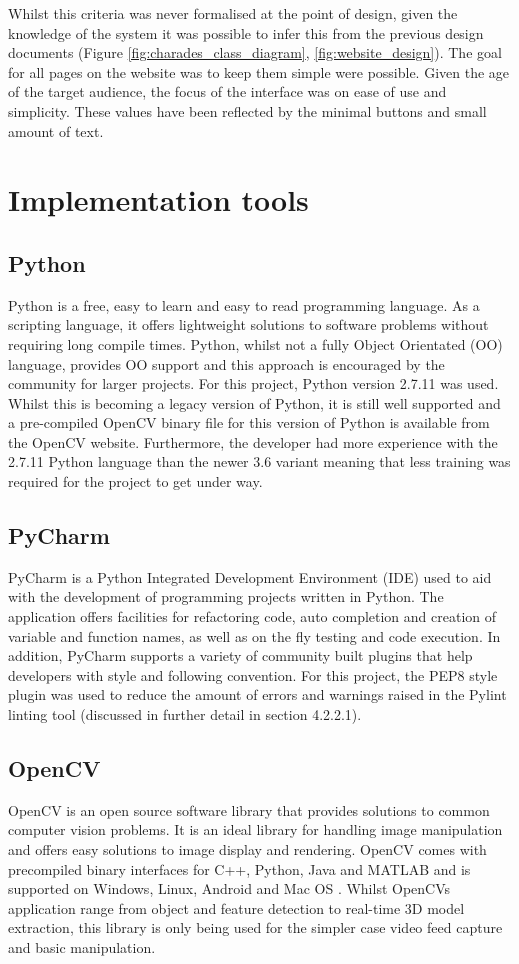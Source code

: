 Whilst this criteria was never formalised at the point of design, given the knowledge of the system it was possible to infer this from the previous design documents (Figure \ref{fig:charades_class_diagram}, \ref{fig:website_design}). The goal for all pages on the website was to keep them simple were possible. Given the age of the target audience, the focus of the interface was on ease of use and simplicity. These values have been reflected by the minimal buttons and small amount of text.

\section{Implementation tools}
\subsection{Python}
Python is a free, easy to learn and easy to read programming language. As a scripting language, it offers lightweight solutions to software problems without requiring long compile times. Python, whilst not a fully Object Orientated (OO) language, provides OO support and this approach is encouraged by the community for larger projects. For this project, Python version 2.7.11 was used. Whilst this is becoming a legacy version of Python, it is still well supported and a pre-compiled OpenCV binary file for this version of Python is available from the OpenCV website. Furthermore, the developer had more experience with the 2.7.11 Python language than the newer 3.6 variant meaning that less training was required for the project to get under way.

\subsection{PyCharm}
PyCharm is a Python Integrated Development Environment (IDE) used to aid with the development of programming projects written in Python. The application offers facilities for refactoring code, auto completion and creation of variable and function names, as well as on the fly testing and code execution. In addition, PyCharm supports a variety of community built plugins that help developers with style and following convention. For this project, the PEP8 style plugin was used to reduce the amount of errors and warnings raised in the Pylint linting tool (discussed in further detail in section 4.2.2.1).

\subsection{OpenCV}
OpenCV is an open source software library that provides solutions to common computer vision problems. It is an ideal library for handling image manipulation and offers easy solutions to image display and rendering. OpenCV comes with precompiled binary interfaces for C++, Python, Java and MATLAB and is supported on Windows, Linux, Android and Mac OS \cite{open_cv_binaries}. Whilst OpenCVs application range from object and feature detection to real-time 3D model extraction, this library is only being used for the simpler case video feed capture and basic manipulation.

